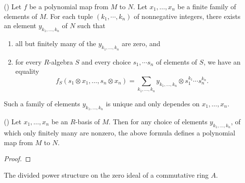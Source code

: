 \begin{theorem}(\cite[Th\'eor\`eme I.1]{Roby63})
Let $f$ be a polynomial map from $M$ to $N$. Let $x_1, \dots, x_n$ be a finite family of elements of $M$. For each tuple $(k_1, \cdots, k_n)$ of nonnegative integers, 
there exists an element $y_{k_1, \dots, k_n}$ of $N$ such that
\begin{enumerate}
\item all but finitely many of the  $y_{k_1, \dots, k_n}$ are zero, and
\item for every $R$-algebra $S$ and every choice $s_1, \cdots s_n$ of elements of $S$, we have an equality
\[ f_S(s_1 \otimes x_1, \dots, s_n \otimes x_n) = \sum_{k_1, \dots, k_n} y_{k_1, \dots, k_n} \otimes s_1^{k_1} \cdots s_n^{k_n}. \]
\end{enumerate}

Such a family of elements $y_{k_1, \dots, k_n}$ is unique and only dependes on $x_1, \dots, x_n$.

\end{theorem}

\begin{theorem}(\cite[Th\'eor\`eme I.1]{Roby63})
\label{thm:polynomial_map}
\leanok
Let $x_1, \dots, x_n$ be an $R$-basis of $M$. Then for any choice of elements $y_{k_1, \dots, k_n}$, of which only finitely many are nonzero, the above formula defines a polynomial map from $M$ to $N$.	
\end{theorem}

\begin{proof}

\end{proof}

\begin{definition}
	\label{def:divided_powers_bot}
	\leanok
	The divided power structure on the zero ideal of a commutative ring $A$.
\end{definition}